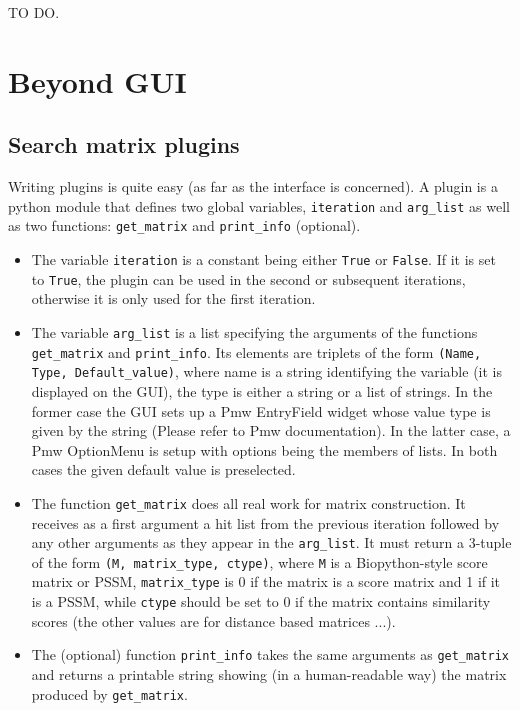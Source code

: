 \documentclass[10pt,letter]{article}
\begin{document}
TO DO.

\section{Beyond GUI}

\subsection{Search matrix plugins}

Writing plugins is quite easy (as far as the interface is concerned). A plugin is a python module that defines two global variables, \texttt{iteration} and \texttt{arg\_list} as well as two functions: \texttt{get\_matrix} and \texttt{print\_info} (optional).

\begin{itemize}
\item The variable \texttt{iteration} is a constant being either \texttt{True} or \texttt{False}. If it is set to \texttt{True}, the plugin can be used in the second or subsequent iterations, otherwise it is only used for the first iteration.

\item The variable \texttt{arg\_list} is a list specifying the arguments of the functions \texttt{get\_matrix} and \texttt{print\_info}. Its elements are triplets of the form \texttt{(Name, Type, Default\_value)}, where name is a string identifying the variable (it is displayed on the GUI), the type is either a string or a list of strings. In the former case the GUI sets up a Pmw EntryField widget whose value type is given by the string (Please refer to Pmw documentation). In the latter case, a Pmw OptionMenu is setup with options being the members of lists. In both cases the given default value is preselected.

\item The function \texttt{get\_matrix} does all real work for matrix construction. It receives as a first argument a hit list from the previous iteration followed by any other arguments as they appear in the \texttt{arg\_list}. It must return a 3-tuple of the form \texttt{(M, matrix\_type, ctype)}, where \texttt{M} is a Biopython-style score matrix or PSSM, \texttt{matrix\_type} is 0 if the matrix is a score matrix and 1 if it is a PSSM, while \texttt{ctype} should be set to 0 if the matrix contains similarity scores (the other values are for distance based matrices ...).

\item The (optional) function \texttt{print\_info} takes the same arguments as \texttt{get\_matrix} and returns a printable string showing (in a human-readable way) the matrix produced by \texttt{get\_matrix}.

\end{itemize}
\end{document}
